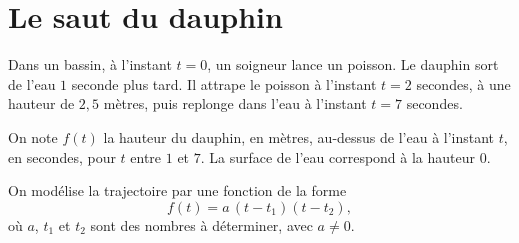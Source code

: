 \documentclass[12pt,a4paper]{article}
\begin{document}
\section*{Le saut du dauphin}

Dans un bassin, à l'instant $t = 0$, un soigneur lance un poisson. Le dauphin sort de l'eau $1$ seconde plus tard. Il attrape le poisson à l'instant $t = 2$ secondes, à une hauteur de $2{,}5$ mètres, puis replonge dans l'eau à l'instant $t = 7$ secondes.

\begin{center}
\end{center}

On note $f(t)$ la hauteur du dauphin, en mètres, au-dessus de l'eau à l'instant $t$, en secondes, pour $t$ entre $1$ et $7$. La surface de l'eau correspond à la hauteur $0$.

On modélise la trajectoire par une fonction de la forme
\[ f(t) = a\,(t - t_1)(t - t_2), \]
où $a$, $t_1$ et $t_2$ sont des nombres à déterminer, avec $a \neq 0$.
\end{document}
